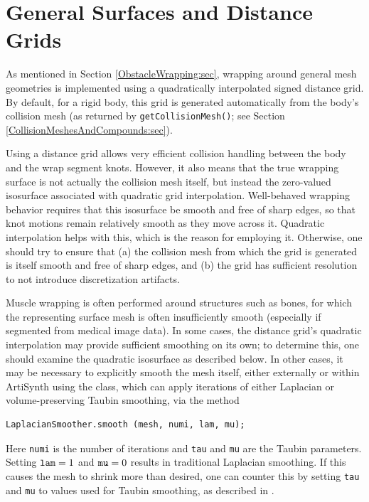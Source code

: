 \section{General Surfaces and Distance Grids}
\label{GeneralSurfaceWrapping:sec}

As mentioned in Section \ref{ObstacleWrapping:sec}, wrapping around
general mesh geometries is implemented using a quadratically
interpolated signed distance grid. By default, for a rigid body, this
grid is generated automatically from the body's collision mesh (as
returned by {\tt getCollisionMesh()}; see Section
\ref{CollisionMeshesAndCompounds:sec}).

Using a distance grid allows very efficient collision handling between
the body and the wrap segment knots. However, it also means that the
true wrapping surface is not actually the collision mesh itself, but
instead the zero-valued isosurface associated with quadratic grid
interpolation.  Well-behaved wrapping behavior requires that this
isosurface be smooth and free of sharp edges, so that knot motions
remain relatively smooth as they move across it. Quadratic
interpolation helps with this, which is the reason for employing
it. Otherwise, one should try to ensure that (a) the collision mesh
from which the grid is generated is itself smooth and free of sharp
edges, and (b) the grid has sufficient resolution to not introduce
discretization artifacts.

Muscle wrapping is often performed around structures such as bones,
for which the representing surface mesh is often insufficiently smooth
(especially if segmented from medical image data).  In some cases, the
distance grid's quadratic interpolation may provide sufficient
smoothing on its own; to determine this, one should examine the
quadratic isosurface as described below. In other cases, it may be
necessary to explicitly smooth the mesh itself, either externally or
within ArtiSynth using the  class,
which can apply iterations of either Laplacian or volume-preserving
Taubin smoothing, via the method
%
\begin{lstlisting}[]
  LaplacianSmoother.smooth (mesh, numi, lam, mu);
\end{lstlisting}
%
Here {\tt numi} is the number of iterations and {\tt tau} and {\tt mu}
are the Taubin parameters. Setting ${\tt lam} = 1$ and ${\tt mu} = 0$
results in traditional Laplacian smoothing. If this causes the mesh to
shrink more than desired, one can counter this by setting {\tt tau}
and {\tt mu} to values used for Taubin smoothing, as described in
\cite{taubin1995curve}.

